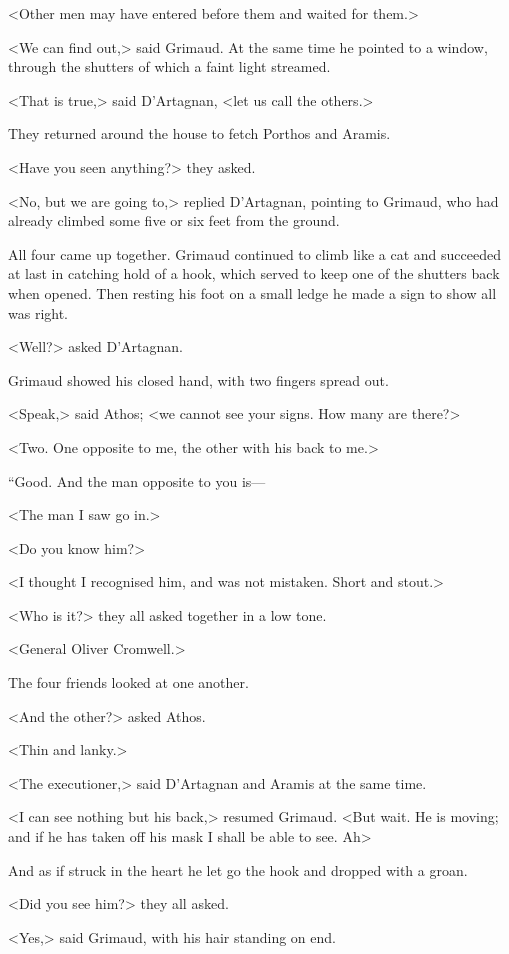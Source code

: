 <Other men may have entered before them and waited for them.>

<We can find out,> said Grimaud. At the same time he pointed to a window, through the shutters of which a faint light streamed.

<That is true,> said D'Artagnan, <let us call the others.>

They returned around the house to fetch Porthos and Aramis.

<Have you seen anything?> they asked.

<No, but we are going to,> replied D'Artagnan, pointing to Grimaud, who had already climbed some five or six feet from the ground.

All four came up together. Grimaud continued to climb like a cat and succeeded at last in catching hold of a hook, which served to keep one of the shutters back when opened. Then resting his foot on a small ledge he made a sign to show all was right.

<Well?> asked D'Artagnan.

Grimaud showed his closed hand, with two fingers spread out.

<Speak,> said Athos; <we cannot see your signs. How many are there?>

<Two. One opposite to me, the other with his back to me.>

“Good. And the man opposite to you is—

<The man I saw go in.>

<Do you know him?>

<I thought I recognised him, and was not mistaken. Short and stout.>

<Who is it?> they all asked together in a low tone.

<General Oliver Cromwell.>

The four friends looked at one another.

<And the other?> asked Athos.

<Thin and lanky.>

<The executioner,> said D'Artagnan and Aramis at the same time.

<I can see nothing but his back,> resumed Grimaud. <But wait. He is moving; and if he has taken off his mask I shall be able to see. Ah\longdash>

And as if struck in the heart he let go the hook and dropped with a groan.

<Did you see him?> they all asked.

<Yes,> said Grimaud, with his hair standing on end.

